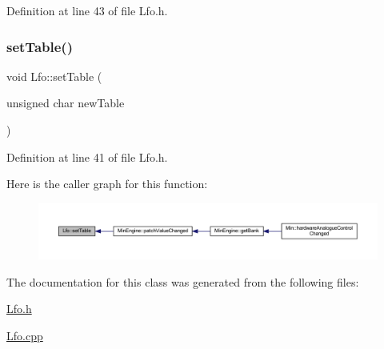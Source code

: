 Definition at line 43 of file Lfo.\+h.

\mbox{\label{class_lfo_a6c0c12b49e8b69c4e839eed57130d2ad}} 
\subsubsection{\texorpdfstring{set\+Table()}{setTable()}}
{\footnotesize\ttfamily void Lfo\+::set\+Table (\begin{DoxyParamCaption}\item[{unsigned char}]{new\+Table }\end{DoxyParamCaption})\hspace{0.3cm}{\ttfamily [inline]}}



Definition at line 41 of file Lfo.\+h.

Here is the caller graph for this function\+:
\nopagebreak
\begin{figure}[H]
\begin{center}
\leavevmode
\includegraphics[width=350pt]{class_lfo_a6c0c12b49e8b69c4e839eed57130d2ad_icgraph}
\end{center}
\end{figure}


The documentation for this class was generated from the following files\+:\begin{DoxyCompactItemize}
\item 
\hyperlink{_lfo_8h}{Lfo.\+h}\item 
\hyperlink{_lfo_8cpp}{Lfo.\+cpp}\end{DoxyCompactItemize}
